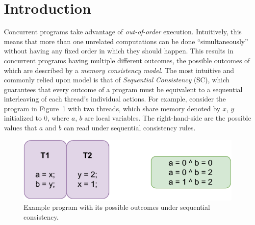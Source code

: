 \section{Introduction} 
    Concurrent programs take advantage of \textit{out-of-order} execution. Intuitively, this means that more than one unrelated computations can be done ``simultaneously'' without having any fixed order in which they should happen. 
    This results in concurrent programs having multiple different outcomes, the possible outcomes of which are described by
    a \textit{memory consistency model}. 
    The most intuitive and commonly relied upon model is that of \textit{Sequential Consistency} (SC), which guarantees that every outcome of a program must be equivalent to a sequential interleaving of each thread's individual actions. 
    For example, consider the program in Figure~\ref{intro:Example} with two threads, which share memory denoted by $x$, $y$ initialized to 0, where $a$, $b$ are local variables. The right-hand-side are the possible values that $a$ and $b$ can read under sequential consistency rules.
    
    \begin{figure}[H]
        \centering
        \includegraphics[scale=0.7]{Program_Example.pdf}
        \caption{Example program with its possible outcomes under sequential consistency.}
        \label{intro:Example}
    \end{figure}
    
